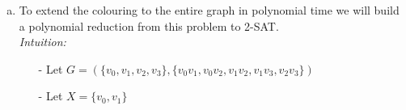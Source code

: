 \documentclass{article}
\begin{document}
\begin{enumerate}[(a)]
    \item To extend the colouring to the entire graph in polynomial time we will build a polynomial reduction from this problem to 2-SAT.\\
    \emph{Intuition:}
    \begin{enumerate}
        \item[-] Let $G = (\{v_0, v_1, v_2, v_3\}, \{v_0v_1, v_0v_2, v_1v_2, v_1v_3, v_2v_3\})$
        \item[-] Let $X = \{v_0, v_1\}$  
    \end{enumerate}
    \begin{center}
\end{center}
\end{enumerate}
\end{document}
